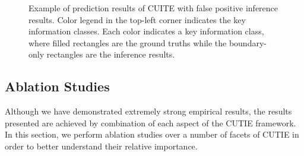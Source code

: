 \documentclass[10pt,twocolumn,letterpaper]{article}
\begin{document}
\begin{figure}
\begin{center}
\end{center}
   \caption{Example of prediction results of CUITE with false positive inference results. Color legend in the top-left corner indicates the key information classes. Each color indicates a key information class, where filled rectangles are the ground truths while the boundary-only rectangles are the inference results.}
\label{fig:falselabel}
\end{figure}


\subsection{Ablation Studies}
Although we have demonstrated extremely strong empirical results, the results presented are achieved by combination of each aspect of the CUTIE framework. In this section, we perform ablation studies over a number of facets of CUTIE in order to better understand their relative importance.
\end{document}
